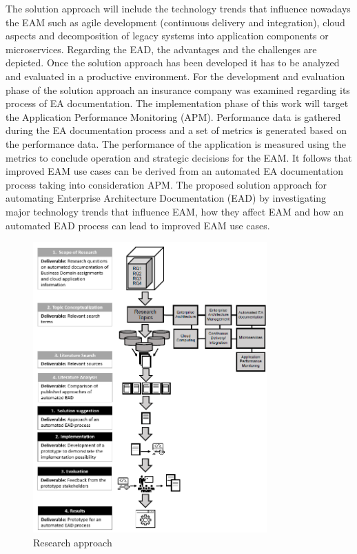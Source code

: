 The solution approach will include the technology trends that influence nowadays the EAM such as agile development (continuous delivery and integration), cloud aspects and decomposition of legacy systems into application components or microservices. Regarding the EAD, the advantages and the challenges are depicted. Once the solution approach has been developed it has to be analyzed and evaluated in a productive environment. For the development and evaluation phase of the solution approach an insurance company was examined regarding its process of EA documentation. The implementation phase of this work will target the Application Performance Monitoring (APM). Performance data is gathered during the EA documentation process and a set of metrics is generated based on the performance data. The performance of the application is measured using the metrics to conclude operation and strategic decisions for the EAM. It follows that improved EAM use cases can be derived from an automated EA documentation process taking into consideration APM. The proposed solution approach for automating Enterprise Architecture Documentation (EAD) by investigating major technology trends that influence EAM, how they affect EAM and how an automated EAD process can lead to improved EAM use cases.
\begin{figure}[htpb]
  \centering
  \includegraphics[width=0.8\textwidth]{figures/approach.PNG}
  \caption{Research approach}
  \label{fig:research-approach}
\end{figure}